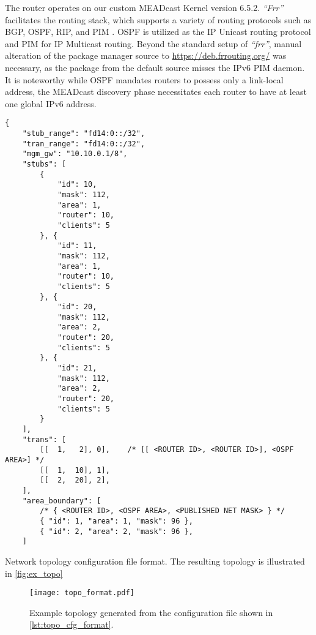 The router operates on our custom MEADcast Kernel version 6.5.2.
\textit{``Frr''} facilitates the routing stack, which supports a variety of
    routing protocols such as BGP, OSPF, RIP, and PIM \cite{frr_doc}.
OSPF is utilized as the IP Unicast routing protocol and PIM for IP Multicast
    routing.
Beyond the standard setup of \textit{``frr''}, manual alteration of the package
    manager source to \url{https://deb.frrouting.org/} was necessary, as the
    package from the default source misses the IPv6 PIM daemon.
It is noteworthy while OSPF mandates routers to possess only a link-local
    address, the MEADcast discovery phase necessitates each router to have at
    least one global IPv6 address.

\begin{listing}
\begin{verbatim}
{
    "stub_range": "fd14:0::/32",
    "tran_range": "fd14:0::/32",
    "mgm_gw": "10.10.0.1/8",
    "stubs": [
        {
            "id": 10,
            "mask": 112,
            "area": 1,
            "router": 10,
            "clients": 5
        }, {
            "id": 11,
            "mask": 112,
            "area": 1,
            "router": 10,
            "clients": 5
        }, {
            "id": 20,
            "mask": 112,
            "area": 2,
            "router": 20,
            "clients": 5
        }, {
            "id": 21,
            "mask": 112,
            "area": 2,
            "router": 20,
            "clients": 5
        }
    ],
    "trans": [
        [[  1,   2], 0],    /* [[ <ROUTER ID>, <ROUTER ID>], <OSPF AREA>] */
        [[  1,  10], 1],
        [[  2,  20], 2],
    ],
    "area_boundary": [
        /* { <ROUTER ID>, <OSPF AREA>, <PUBLISHED NET MASK> } */
        { "id": 1, "area": 1, "mask": 96 },
        { "id": 2, "area": 2, "mask": 96 },
    ]
\end{verbatim}
    \caption[Network topology configuration file format]{
        Network topology configuration file format.
        The resulting topology is illustrated in \autoref{fig:ex_topo}
    }
    \label{lst:topo_cfg_format}
\end{listing}

\begin{figure}
    \begin{center}
        \texttt{[image: topo\_format.pdf]}
    \end{center}
    \caption[Example topology]{
        Example topology generated from the configuration file shown in
        \autoref{lst:topo_cfg_format}.
    }
    \label{fig:ex_topo}
\end{figure}

